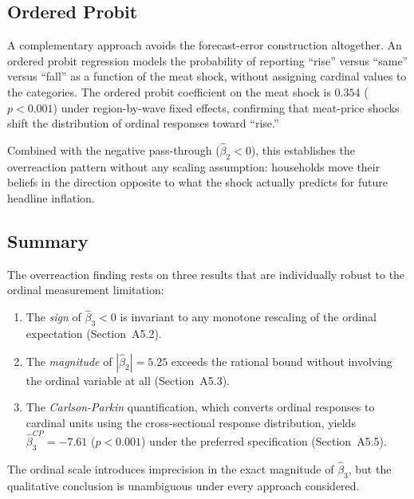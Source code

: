 \subsection{Ordered Probit}\label{app:ordered_probit}

A complementary approach avoids the forecast-error construction
altogether.
An ordered probit regression models the probability of
reporting ``rise'' versus ``same'' versus ``fall'' as a
function of the meat shock, without assigning cardinal values
to the categories.
The ordered probit coefficient on the meat shock is $0.354$
($p < 0.001$) under region-by-wave fixed effects, confirming
that meat-price shocks shift the distribution of ordinal
responses toward ``rise.''

Combined with the negative pass-through ($\hat{\beta}_2 < 0$),
this establishes the overreaction pattern without any scaling
assumption: households move their beliefs in the direction
opposite to what the shock actually predicts for future
headline inflation.

\subsection{Summary}

The overreaction finding rests on three results that are
individually robust to the ordinal measurement limitation:
\begin{enumerate}
  \item The \textit{sign} of $\hat{\beta}_3 < 0$ is invariant
    to any monotone rescaling of the ordinal expectation
    (Section~A5.2).
  \item The \textit{magnitude} of $|\hat{\beta}_2| = 5.25$
    exceeds the rational bound without involving the ordinal
    variable at all (Section~A5.3).
  \item The \textit{Carlson-Parkin} quantification, which
    converts ordinal responses to cardinal units using the
    cross-sectional response distribution, yields
    $\hat{\beta}_3^{CP} = -7.61$ ($p < 0.001$) under the
    preferred specification (Section~A5.5).
\end{enumerate}
The ordinal scale introduces imprecision in the exact magnitude
of $\hat{\beta}_3$, but the qualitative conclusion is
unambiguous under every approach considered.

